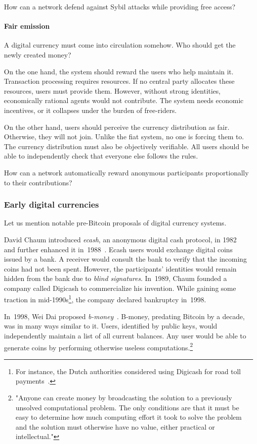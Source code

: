 How can a network defend against Sybil attacks while providing free access?


\paragraph{Fair emission}

A digital currency must come into circulation somehow.
Who should get the newly created money?

On the one hand, the system should reward the users who help maintain it.
Transaction processing requires resources.
If no central party allocates these resources, users must provide them.
However, without strong identities, economically rational agents would not contribute.
The system needs economic incentives, or it collapses under the burden of free-riders.

On the other hand, users should perceive the currency distribution as fair.
Otherwise, they will not join.
Unlike the fiat system, no one is forcing them to.
The currency distribution must also be objectively verifiable.
All users should be able to independently check that everyone else follows the rules.

How can a network automatically reward anonymous participants proportionally to their contributions?


\subsubsection*{Early digital currencies}

Let us mention notable pre-Bitcoin proposals of digital currency systems.

David Chaum introduced \textit{ecash}, an anonymous digital cash protocol, in 1982~\cite{Chaum1982} and further enhanced it in~1988~\cite{Chaum1988}.
Ecash users would exchange digital coins issued by a bank.
A receiver would consult the bank to verify that the incoming coins had not been spent.
However, the participants' identities would remain hidden from the bank due to \textit{blind signatures}.
In~1989, Chaum founded a company called Digicash to commercialize his invention.
While gaining some traction in mid-1990s\footnote{For instance, the Dutch authorities considered using Digicash for road toll payments~\cite{Chaum2019}.}, the company declared bankruptcy in~1998.

In~1998, Wei Dai proposed \textit{b-money}~\cite{Dai1998}.
B-money, predating Bitcoin by a decade, was in many ways similar to it.
Users, identified by public keys, would independently maintain a list of all current balances.
Any user would be able to generate coins by performing otherwise useless computations.\footnote{"Anyone can create money by broadcasting the solution to a previously unsolved computational problem. The only conditions are that it must be easy to determine how much computing effort it took to solve the problem and the solution must otherwise have no value, either practical or intellectual."}

